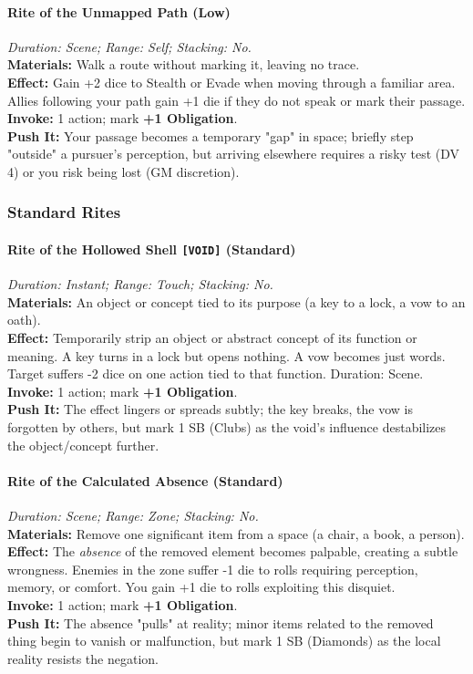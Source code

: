 \paragraph{Rite of the Unmapped Path (Low)}
\emph{Duration: Scene; Range: Self; Stacking: No.}\\
\textbf{Materials:} Walk a route without marking it, leaving no trace.\\
\textbf{Effect:} Gain +2 dice to Stealth or Evade when moving through a familiar area. Allies following your path gain +1 die if they do not speak or mark their passage.\\
\textbf{Invoke:} 1 action; mark \textbf{+1 Obligation}.\\
\textbf{Push It:} Your passage becomes a temporary "gap" in space; briefly step "outside" a pursuer's perception, but arriving elsewhere requires a risky test (DV 4) or you risk being lost (GM discretion).

\subsubsection*{Standard Rites}

\paragraph{Rite of the Hollowed Shell \texttt{[VOID]} (Standard)}
\emph{Duration: Instant; Range: Touch; Stacking: No.}\\
\textbf{Materials:} An object or concept tied to its purpose (a key to a lock, a vow to an oath).\\
\textbf{Effect:} Temporarily strip an object or abstract concept of its function or meaning. A key turns in a lock but opens nothing. A vow becomes just words. Target suffers -2 dice on one action tied to that function. Duration: Scene.\\
\textbf{Invoke:} 1 action; mark \textbf{+1 Obligation}.\\
\textbf{Push It:} The effect lingers or spreads subtly; the key breaks, the vow is forgotten by others, but mark 1 SB (Clubs) as the void's influence destabilizes the object/concept further.

\paragraph{Rite of the Calculated Absence (Standard)}
\emph{Duration: Scene; Range: Zone; Stacking: No.}\\
\textbf{Materials:} Remove one significant item from a space (a chair, a book, a person).\\
\textbf{Effect:} The \emph{absence} of the removed element becomes palpable, creating a subtle wrongness. Enemies in the zone suffer -1 die to rolls requiring perception, memory, or comfort. You gain +1 die to rolls exploiting this disquiet.\\
\textbf{Invoke:} 1 action; mark \textbf{+1 Obligation}.\\
\textbf{Push It:} The absence "pulls" at reality; minor items related to the removed thing begin to vanish or malfunction, but mark 1 SB (Diamonds) as the local reality resists the negation.

